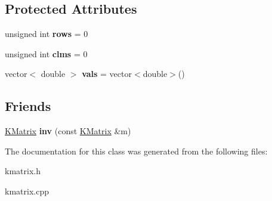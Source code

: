 \subsection*{Protected Attributes}
\begin{DoxyCompactItemize}
\item 
\hypertarget{class_k_base_1_1_k_matrix_a48c47ae18ab41bb48b47e3c7c6cc5fd5}{unsigned int {\bfseries rows} = 0}\label{class_k_base_1_1_k_matrix_a48c47ae18ab41bb48b47e3c7c6cc5fd5}

\item 
\hypertarget{class_k_base_1_1_k_matrix_ac3a43df2f84481d2cad99768d66c8093}{unsigned int {\bfseries clms} = 0}\label{class_k_base_1_1_k_matrix_ac3a43df2f84481d2cad99768d66c8093}

\item 
\hypertarget{class_k_base_1_1_k_matrix_a04f0e8fddb65b1b481d6ca8f3783fb0d}{vector$<$ double $>$ {\bfseries vals} = vector$<$double$>$()}\label{class_k_base_1_1_k_matrix_a04f0e8fddb65b1b481d6ca8f3783fb0d}

\end{DoxyCompactItemize}
\subsection*{Friends}
\begin{DoxyCompactItemize}
\item 
\hypertarget{class_k_base_1_1_k_matrix_a2113818dcb2a9a07232d94f3f9aa4960}{\hyperlink{class_k_base_1_1_k_matrix}{K\-Matrix} {\bfseries inv} (const \hyperlink{class_k_base_1_1_k_matrix}{K\-Matrix} \&m)}\label{class_k_base_1_1_k_matrix_a2113818dcb2a9a07232d94f3f9aa4960}

\end{DoxyCompactItemize}


The documentation for this class was generated from the following files\-:\begin{DoxyCompactItemize}
\item 
kmatrix.\-h\item 
kmatrix.\-cpp\end{DoxyCompactItemize}
